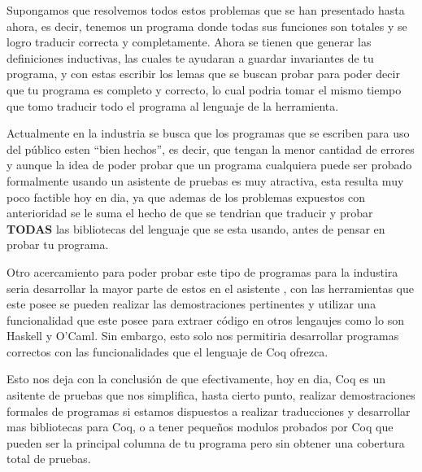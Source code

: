 Supongamos que resolvemos todos estos problemas que se han presentado hasta ahora, es decir,
tenemos un programa donde todas sus funciones son totales y se logro traducir correcta y
completamente. Ahora se tienen que generar las definiciones inductivas, las cuales te ayudaran a
guardar invariantes de tu programa, y con estas escribir los lemas que se buscan probar para poder
decir que tu programa es completo y correcto, lo cual podria tomar el mismo tiempo que tomo
traducir todo el programa al lenguaje de la herramienta.

Actualmente en la industria se busca que los programas que se escriben para uso del p\'ublico esten
``bien hechos'', es decir, que tengan la menor cantidad de errores y aunque la idea de poder probar
que un programa cualquiera puede ser probado formalmente usando un asistente de pruebas es muy
atractiva, esta resulta muy poco factible hoy en dia, ya que ademas de los problemas expuestos con
anterioridad se le suma el hecho de que se tendrian que traducir y probar \textbf{TODAS} las
bibliotecas del lenguaje que se esta usando, antes de pensar en probar tu programa.

Otro acercamiento para poder probar este tipo de programas para la industira seria desarrollar la
mayor parte de estos en el asistente {\coq}, con las herramientas que este posee se pueden realizar
las demostraciones pertinentes y utilizar una funcionalidad que este posee para extraer c\'odigo en
otros lengaujes como lo son Haskell y O'Caml. Sin embargo, esto solo nos permitiria desarrollar
programas correctos con las funcionalidades que el lenguaje de Coq ofrezca.

Esto nos deja con la conclusi\'on de que efectivamente, hoy en dia, Coq es un asitente de pruebas
que nos simplifica, hasta cierto punto, realizar demostraciones formales de programas si estamos
dispuestos a realizar traducciones y desarrollar mas bibliotecas para Coq, o a tener pequeños
modulos probados por Coq que pueden ser la principal columna de tu programa pero sin obtener una
cobertura total de pruebas.
